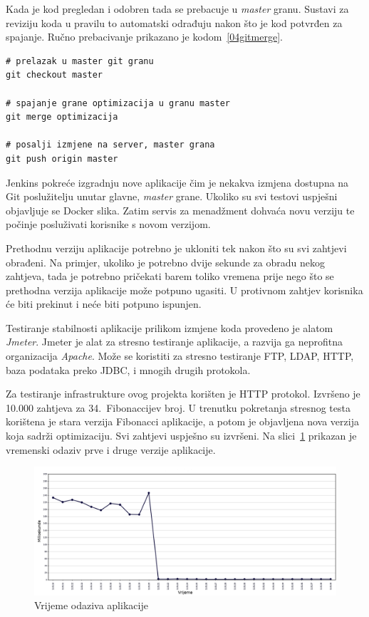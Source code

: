 Kada je kod pregledan i odobren tada se prebacuje u \textit{master} granu. Sustavi za reviziju koda
u pravilu to automatski odrađuju nakon što je kod potvrđen za spajanje. Ručno prebacivanje prikazano
je kodom~\ref{04gitmerge}.

\begin{lstlisting}[float=h]
# prelazak u master git granu
git checkout master

# spajanje grane optimizacija u granu master
git merge optimizacija

# posalji izmjene na server, master grana
git push origin master
\end{lstlisting}

Jenkins pokreće izgradnju nove aplikacije čim je nekakva izmjena dostupna na Git poslužitelju unutar
glavne, \textit{master} grane. Ukoliko su svi testovi uspješni objavljuje se Docker slika. Zatim
servis za menadžment dohvaća novu verziju te počinje posluživati korisnike s novom verzijom.

Prethodnu verziju aplikacije potrebno je ukloniti tek nakon što su svi zahtjevi obrađeni. Na
primjer, ukoliko je potrebno dvije sekunde za obradu nekog zahtjeva, tada je potrebno pričekati
barem toliko vremena prije nego što se prethodna verzija aplikacije može potpuno ugasiti.  U
protivnom zahtjev korisnika će biti prekinut i neće biti potpuno ispunjen.

Testiranje stabilnosti aplikacije prilikom izmjene koda provedeno je alatom \textit{Jmeter}. Jmeter
je alat za stresno testiranje aplikacije, a razvija ga neprofitna organizacija \textit{Apache}. Može
se koristiti za stresno testiranje FTP, LDAP, HTTP, baza podataka preko JDBC, i mnogih drugih
protokola.

Za testiranje infrastrukture ovog projekta korišten je HTTP protokol. Izvršeno je 10.000 zahtjeva
za 34.~Fibonaccijev broj. U trenutku pokretanja stresnog testa korištena je stara verzija Fibonacci
aplikacije, a potom je objavljena nova verzija koja sadrži optimizaciju. Svi zahtjevi uspješno su
izvršeni. Na slici~\ref{fig:04stresstest} prikazan je vremenski odaziv prve i druge verzije
aplikacije.

\begin{figure}[h]
    \centering
    \includegraphics[width=\textwidth]{img/04/response_time.png}
    \caption{Vrijeme odaziva aplikacije}%
    \label{fig:04stresstest}
\end{figure}

